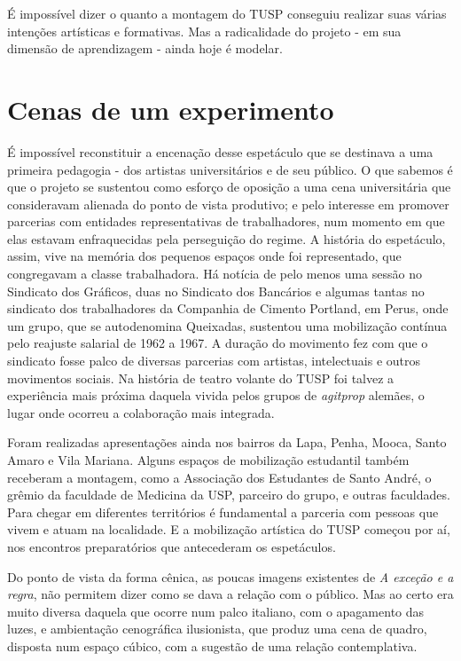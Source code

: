 É impossível dizer o quanto a montagem do TUSP conseguiu realizar suas
várias intenções artísticas e formativas. Mas a radicalidade do projeto
- em sua dimensão de aprendizagem - ainda hoje é modelar.

\section{Cenas de um experimento}

É impossível reconstituir a encenação desse espetáculo que se destinava
a uma primeira pedagogia - dos artistas universitários e de seu público.
O que sabemos é que o projeto se sustentou como esforço de oposição a
uma cena universitária que consideravam alienada do ponto de vista
produtivo; e pelo interesse em promover parcerias com entidades
representativas de trabalhadores, num momento em que elas estavam
enfraquecidas pela perseguição do regime. A história do espetáculo,
assim, vive na memória dos pequenos espaços onde foi representado, que
congregavam a classe trabalhadora. Há notícia de pelo menos uma sessão
no Sindicato dos Gráficos, duas no Sindicato dos Bancários e algumas
tantas no sindicato dos trabalhadores da Companhia de Cimento Portland,
em Perus, onde um grupo, que se autodenomina Queixadas, sustentou uma
mobilização contínua pelo reajuste salarial de 1962 a 1967. A duração do
movimento fez com que o sindicato fosse palco de diversas parcerias com
artistas, intelectuais e outros movimentos sociais. Na história de
teatro volante do TUSP foi talvez a experiência mais próxima daquela
vivida pelos grupos de \textit{agitprop} alemães, o lugar onde ocorreu a
colaboração mais integrada.

Foram realizadas apresentações ainda nos bairros da Lapa, Penha, Mooca,
Santo Amaro e Vila Mariana. Alguns espaços de mobilização estudantil
também receberam a montagem, como a Associação dos Estudantes de Santo
André, o grêmio da faculdade de Medicina da USP, parceiro do grupo, e
outras faculdades. Para chegar em diferentes territórios é fundamental a
parceria com pessoas que vivem e atuam na localidade. E a mobilização
artística do TUSP começou por aí, nos encontros preparatórios que
antecederam os espetáculos.

Do ponto de vista da forma cênica, as poucas imagens existentes de
\textit{A exceção e a regra}, não permitem dizer como se dava a relação com
o público. Mas ao certo era muito diversa daquela que ocorre num palco
italiano, com o apagamento das luzes, e ambientação cenográfica
ilusionista, que produz uma cena de quadro, disposta num espaço cúbico,
com a sugestão de uma relação contemplativa.

